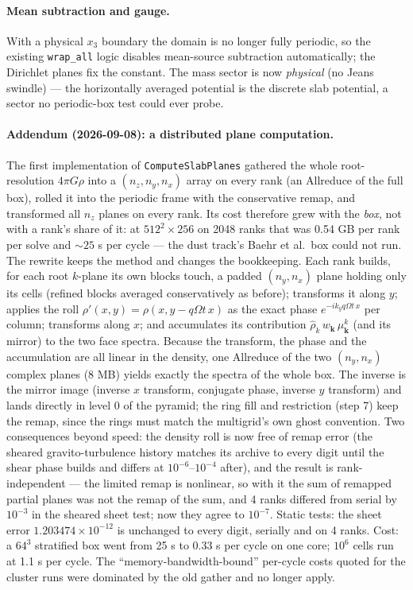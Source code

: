 \documentclass[11pt]{article}
\newcommand{\code}[1]{\texttt{#1}}
\newcommand{\fn}[1]{\texttt{\small #1}}
\begin{document}
\paragraph{Mean subtraction and gauge.} With a physical $x_3$ boundary the domain is
no longer fully periodic, so the existing \code{wrap\_all} logic disables mean-source
subtraction automatically; the Dirichlet planes fix the constant. The mass sector is
now \emph{physical} (no Jeans swindle) --- the horizontally averaged potential is the
discrete slab potential, a sector no periodic-box test could ever probe.

\paragraph{Addendum (2026-09-08): a distributed plane computation.} The first
implementation of \fn{ComputeSlabPlanes} gathered the whole root-resolution
$4\pi G\rho$ into a $(n_z,n_y,n_x)$ array on every rank (an Allreduce of the full box),
rolled it into the periodic frame with the conservative remap, and transformed all
$n_z$ planes on every rank. Its cost therefore grew with the \emph{box}, not with a
rank's share of it: at $512^2\times256$ on 2048 ranks that was 0.54 GB per rank per
solve and $\sim25$ s per cycle --- the dust track's Baehr et al.\ box could not run.
The rewrite keeps the method and changes the bookkeeping. Each rank builds, for each
root $k$-plane its own blocks touch, a padded $(n_y,n_x)$ plane holding only its cells
(refined blocks averaged conservatively as before); transforms it along $y$; applies
the roll $\rho'(x,y) = \rho(x, y - q\Omega t\,x)$ as the exact phase
$e^{-i k_y q\Omega t\, x}$ per column; transforms along $x$; and accumulates its
contribution $\hat\rho_{k}\, w_{\mathbf k}\,\mu_{\mathbf k}^{k}$ (and its mirror) to the
two face spectra. Because the transform, the phase and the accumulation are all linear
in the density, one Allreduce of the two $(n_y,n_x)$ complex planes (8 MB) yields
exactly the spectra of the whole box. The inverse is the mirror image (inverse $x$
transform, conjugate phase, inverse $y$ transform) and lands directly in level 0 of the
pyramid; the ring fill and restriction (step 7) keep the remap, since the rings must
match the multigrid's own ghost convention. Two consequences beyond speed: the density
roll is now free of remap error (the sheared gravito-turbulence history matches its
archive to every digit until the shear phase builds and differs at $10^{-6}$--$10^{-4}$
after), and the result is rank-independent --- the limited remap is nonlinear, so with
it the sum of remapped partial planes was not the remap of the sum, and 4 ranks
differed from serial by $10^{-3}$ in the sheared sheet test; now they agree to
$10^{-7}$. Static tests: the sheet error $1.203474\times10^{-12}$ is unchanged to
every digit, serially and on 4 ranks. Cost: a $64^3$ stratified box went from 25 s to
0.33 s per cycle on one core; $10^6$ cells run at 1.1 s per cycle. The
``memory-bandwidth-bound'' per-cycle costs quoted for the cluster runs were dominated
by the old gather and no longer apply.
\end{document}
